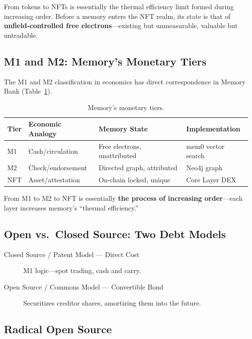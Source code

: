 \documentclass[11pt,a4paper]{article}
\begin{document}
From tokens to NFTs is essentially the thermal efficiency limit formed during increasing order.
Before a memory enters the NFT realm, its state is that of \textbf{unfield-controlled free electrons}---existing but unmeasurable, valuable but untradable.

\subsection{M1 and M2: Memory's Monetary Tiers}
\label{sub:monetary_tiers}

The M1 and M2 classification in economics has direct correspondence in Memory Bank (Table~\ref{tab:monetary}).

\begin{table}[ht]
\centering
\caption{Memory's monetary tiers.}
\label{tab:monetary}
\small
\begin{tabular}{@{}llll@{}}
\toprule
\textbf{Tier} & \textbf{Economic Analogy} & \textbf{Memory State} & \textbf{Implementation} \\
\midrule
M1  & Cash/circulation   & Free electrons, unattributed & mem0 vector search \\
M2  & Check/endorsement  & Directed graph, attributed   & Neo4j graph        \\
NFT & Asset/attestation  & On-chain locked, unique      & Core Layer DEX     \\
\bottomrule
\end{tabular}
\end{table}

From M1 to M2 to NFT is essentially \textbf{the process of increasing order}---each layer increases memory's ``thermal efficiency.''

\subsection{Open vs.\ Closed Source: Two Debt Models}
\label{sub:debt_models}

\begin{description}
  \item[Closed Source / Patent Model --- Direct Cost] M1 logic---spot trading, cash and carry.
  \item[Open Source / Commons Model --- Convertible Bond] Securitizes creditor shares, amortizing them into the future.
\end{description}

\subsection{Radical Open Source}
\label{sub:radical_oss}
\end{document}
